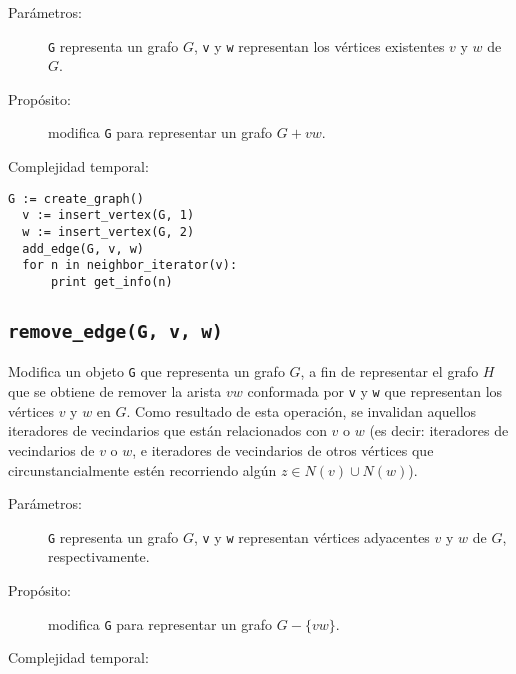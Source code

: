 \documentclass[%
    a4paper,%
    12pt,%
    twoside,%
    openright,%
    halfparskip,%
    cleardoubleempty,%
    bigheadings,%
    titlepage,%
    headsepline%
]{scrbook}
\makeatletter
\newcommand{\Code}[1]{\lstinline[basicstyle={\tt}]@#1@}
\makeatother
\begin{document}
\begin{description}
  \item [Parámetros:] \Code{G} representa un grafo $G$, \Code{v} y \Code{w} representan los vértices existentes $v$ y $w$ de $G$.
  \item [Propósito:] modifica \Code{G} para representar un grafo $G + vw$.
  \item [Complejidad temporal:]
\end{description}


\begin{lstlisting}[caption={Ejemplo de uso de add\_edge. El código crea un grafo $G$ con dos vértices, el primero \texttt{v} representa al vértice $v$ con el número 1 y el segundo \texttt{w} representa al vértice $w$ con el número 2 como infomación. Luego, crea la arista $vw$ entre estos dos vértices dentro del grafo $G$. El ciclo imprime cada uno de los valores de los vecinos de $v$, en este caso como $w$ es su único vecino imprime ``2''. Ver Sección~\ref{sec:tad grafo:neighbor-iterator} para más información de \texttt{neghbor\_iterator}.},gobble=2,float=ht,label={lst:pseudo:add_edge},emph={add_edge}]
  G := create_graph()
  v := insert_vertex(G, 1)
  w := insert_vertex(G, 2)
  add_edge(G, v, w)
  for n in neighbor_iterator(v):
      print get_info(n)
\end{lstlisting}


\subsection{\texttt{remove\_edge(G, v, w)}}
\label{sec:tad grafo:remove-edge}

Modifica un objeto \Code{G} que representa un grafo $G$, a fin de representar el grafo $H$ que se obtiene de remover la arista $vw$ conformada por \Code{v} y \Code{w} que representan los vértices $v$ y $w$ en $G$.
Como resultado de esta operación, se invalidan aquellos iteradores de vecindarios que están relacionados con $v$ o $w$ (es decir:  iteradores de vecindarios de $v$ o $w$, e iteradores de vecindarios de otros vértices que circunstancialmente estén recorriendo algún $z \in N(v) \cup N(w)$).

\begin{description}
  \item [Parámetros:] \Code{G} representa un grafo $G$, \Code{v} y \Code{w} representan vértices adyacentes $v$ y $w$ de $G$, respectivamente.
  \item [Propósito:] modifica \Code{G} para representar un grafo $G - \{vw\}$.
  \item [Complejidad temporal:]
\end{description}
\end{document}
